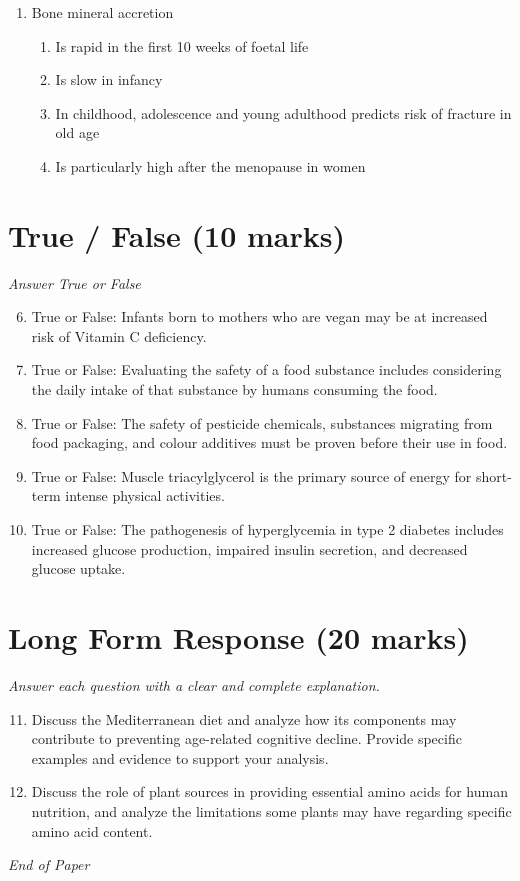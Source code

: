 \documentclass[12pt]{article}
\begin{document}
\begin{enumerate}[label=\arabic*.]
\begin{enumerate}[label=(\alph*)]
    \item Particular care must be taken during breast feeding in high risk infants
    \item Living on a working farm will increase the development of atopic diseases
\end{enumerate}
\item Bone mineral accretion
\begin{enumerate}[label=(\alph*)]
    \item Is rapid in the first 10 weeks of foetal life
    \item Is slow in infancy
    \item In childhood, adolescence and young adulthood predicts risk of fracture in old age
    \item Is particularly high after the menopause in women
\end{enumerate}
\end{enumerate}

\section*{True / False (10 marks)}
\textit{Answer True or False}
\begin{enumerate}[label=\arabic*.]
\setcounter{enumi}{5}
\item True or False: Infants born to mothers who are vegan may be at increased risk of Vitamin C deficiency.
\item True or False: Evaluating the safety of a food substance includes considering the daily intake of that substance by humans consuming the food.
\item True or False: The safety of pesticide chemicals, substances migrating from food packaging, and colour additives must be proven before their use in food.
\item True or False: Muscle triacylglycerol is the primary source of energy for short-term intense physical activities.
\item True or False: The pathogenesis of hyperglycemia in type 2 diabetes includes increased glucose production, impaired insulin secretion, and decreased glucose uptake.
\end{enumerate}

\section*{Long Form Response (20 marks)}
\textit{Answer each question with a clear and complete explanation.}
\begin{enumerate}[label=\arabic*.]
\setcounter{enumi}{10}
\item Discuss the Mediterranean diet and analyze how its components may contribute to preventing age-related cognitive decline. Provide specific examples and evidence to support your analysis.
\item Discuss the role of plant sources in providing essential amino acids for human nutrition, and analyze the limitations some plants may have regarding specific amino acid content.
\end{enumerate}

\vfill
\noindent\textit{End of Paper}
\end{document}
